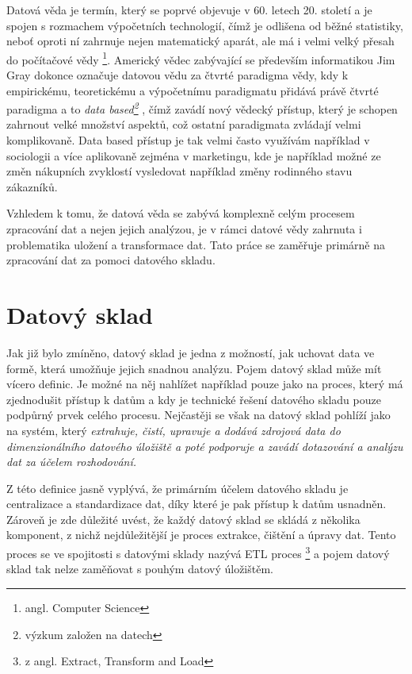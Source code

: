\documentclass[
  digital,     %
  twoside,     %
  lof,         %
  lot,         %
]{fithesis4}
\begin{document}
 Datová věda je termín, který se poprvé objevuje v 60. letech 20. století a je spojen s rozmachem výpočetních technologií, čímž je odlišena od běžné statistiky, neboť  oproti ní zahrnuje nejen matematický aparát, ale má i velmi velký přesah do počítačové vědy \footnote{angl. Computer Science
 }.   \parencite{Foote2021} Americký vědec zabývající se především informatikou Jim Gray dokonce označuje datovou vědu za čtvrté paradigma vědy, kdy k empirickému, teoretickému a výpočetnímu paradigmatu přidává právě čtvrté paradigma a to \emph{data based\footnote{výzkum založen na datech}} \parencite{hey2009fourth}, čímž zavádí nový vědecký přístup, který je schopen zahrnout velké množství aspektů, což ostatní paradigmata zvládají velmi komplikovaně. Data based přístup je tak velmi často využívám například v sociologii a více aplikovaně zejména v marketingu, kde je například možné ze změn nákupních zvyklostí vysledovat například změny rodinného stavu zákazníků.\parencite{Zeleny2015}
 
Vzhledem k tomu, že datová věda se zabývá komplexně celým procesem zpracování dat a nejen jejich analýzou, je v rámci datové vědy zahrnuta i problematika uložení a transformace dat. Tato práce se zaměřuje primárně na zpracování dat za pomoci datového skladu. 

\chapter {Datový sklad}
Jak již bylo zmíněno, datový sklad je jedna z možností, jak uchovat data ve formě, která umožňuje jejich snadnou analýzu. Pojem datový sklad může mít vícero definic. Je možné na něj nahlížet například pouze jako na proces, který má zjednodušit přístup k datům a kdy je technické řešení datového skladu pouze podpůrný prvek celého procesu. Nejčastěji se však na datový sklad pohlíží jako na systém, který \emph{extrahuje, čistí, upravuje a dodává zdrojová data do dimenzionálního
datového úložiště a poté podporuje a zavádí dotazování a analýzu dat za účelem
rozhodování.} \parencite[s.~23]{Kimballc2004}

Z této definice jasně vyplývá, že primárním účelem datového skladu je centralizace a
standardizace dat, díky které je pak přístup k datům usnadněn. Zároveň je zde důležité
uvést, že každý datový sklad se skládá z několika komponent, z nichž nejdůležitější je proces
extrakce, čištění a úpravy dat. Tento proces se ve spojitosti s datovými sklady nazývá ETL
proces \footnote{z angl. Extract, Transform and Load} a pojem datový sklad tak nelze zaměňovat
s pouhým datový úložištěm. \parencite[s.~24]{Kimballc2004}
\end{document}
